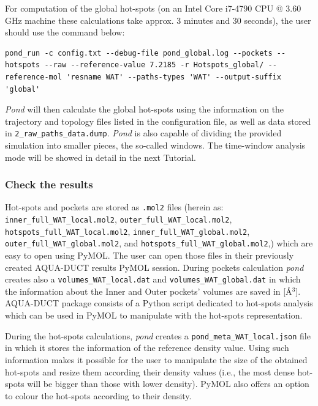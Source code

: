 \documentclass[9pt,tutorial]{livecoms}
\begin{document}
For computation of the global hot-spots (on an Intel Core i7-4790 CPU @ 3.60 GHz machine these calculations take approx. 3 minutes and 30 seconds), the user should use the command below:
\begin{lstlisting}[columns=fullflexible]
pond_run -c config.txt --debug-file pond_global.log --pockets --hotspots --raw --reference-value 7.2185 -r Hotspots_global/ --reference-mol 'resname WAT' --paths-types 'WAT' --output-suffix 'global'
\end{lstlisting}
\emph{Pond} will then calculate the global hot-spots using the information on the trajectory and topology files listed in the configuration file, as well as data stored in \texttt{2\_raw\_paths\_data.dump}. 
\emph{Pond} is also capable of dividing the provided simulation into smaller pieces, the so-called windows. The time-window analysis mode will be showed in detail in the next Tutorial.

\subsubsection{Check the results}
Hot-spots and pockets are stored as \texttt{.mol2} files (herein as: \texttt{inner\_full\_WAT\_local.mol2}, \texttt{outer\_full\_WAT\_local.mol2}, \texttt{hotspots\_full\_WAT\_local.mol2}, \newline \texttt{inner\_full\_WAT\_global.mol2}, \texttt{outer\_full\_WAT\_global.mol2}, and \texttt{hotspots\_full\_WAT\_global.mol2},) which are easy to open using PyMOL. The user can open those files in their previously created AQUA-DUCT results PyMOL session. During pockets calculation \emph{pond} creates also a \texttt{volumes\_WAT\_local.dat} and \texttt{volumes\_WAT\_global.dat} in which the information about the Inner and Outer pockets' volumes are saved in [Å\( \displaystyle ^{3}\)]. AQUA-DUCT package consists of a Python script dedicated to hot-spots analysis which can be used in PyMOL to manipulate with the hot-spots representation. 

During the hot-spots calculations, \emph{pond} creates a \texttt{pond\_meta\_WAT\_local.json} file in which it stores the information of the reference density value. Using such information makes it possible for the user to manipulate the size of the obtained hot-spots and resize them according their density values (i.e., the most dense hot-spots will be bigger than those with lower density). PyMOL also offers an option to colour the hot-spots according to their density.
\end{document}
